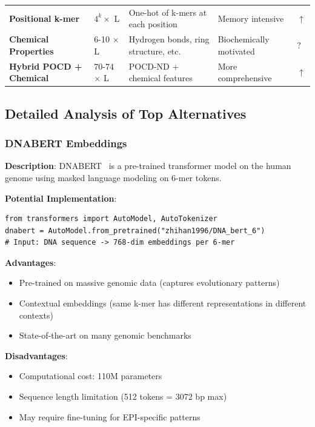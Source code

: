 \documentclass[11pt,a4paper]{article}
\begin{document}
\begin{longtable}{L{2.5cm}L{3cm}L{4cm}L{2.5cm}C{1.5cm}}
\textbf{Positional k-mer} & $4^k \times$ L & One-hot of k-mers at each position & Memory intensive & \textcolor{positive}{$\uparrow$} \\

\textbf{Chemical Properties} & 6-10 $\times$ L & Hydrogen bonds, ring structure, etc. & Biochemically motivated & \textcolor{uncertain}{$?$} \\

\textbf{Hybrid POCD + Chemical} & 70-74 $\times$ L & POCD-ND + chemical features & More comprehensive & \textcolor{positive}{$\uparrow$} \\

\end{longtable}

\subsection{Detailed Analysis of Top Alternatives}

\subsubsection{DNABERT Embeddings}

\textbf{Description}: DNABERT~\cite{ji2021dnabert} is a pre-trained transformer model on the human genome using masked language modeling on 6-mer tokens.

\textbf{Potential Implementation}:
\begin{verbatim}
from transformers import AutoModel, AutoTokenizer
dnabert = AutoModel.from_pretrained("zhihan1996/DNA_bert_6")
# Input: DNA sequence -> 768-dim embeddings per 6-mer
\end{verbatim}

\textbf{Advantages}:
\begin{itemize}
    \item Pre-trained on massive genomic data (captures evolutionary patterns)
    \item Contextual embeddings (same k-mer has different representations in different contexts)
    \item State-of-the-art on many genomic benchmarks
\end{itemize}

\textbf{Disadvantages}:
\begin{itemize}
    \item Computational cost: 110M parameters
    \item Sequence length limitation (512 tokens = 3072 bp max)
    \item May require fine-tuning for EPI-specific patterns
\end{itemize}
\end{document}
